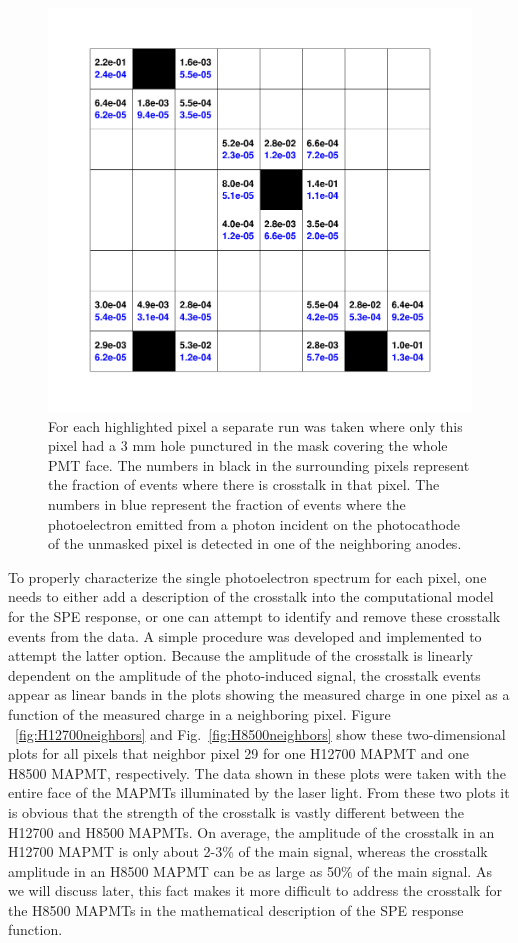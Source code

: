 \begin{figure}
	\centering
	\includegraphics[width=\linewidth]{figures/H12700_ct_ratio_updated.png}
	\caption{For each highlighted pixel a separate run was taken where only this pixel had a 3 mm hole punctured in the mask covering the whole PMT face. The numbers in black in the surrounding pixels represent the fraction of events where there is crosstalk in that pixel. The numbers in blue represent the fraction of events where the photoelectron emitted from a photon incident on the photocathode of the unmasked pixel is detected in one of the neighboring anodes.}
	\label{fig:H12700_ct_ratio}
\end{figure}

To properly characterize the single photoelectron spectrum for each pixel, one needs to either add a description of the crosstalk into the computational model for the SPE response, or one can attempt to identify and remove these crosstalk events from the data. A simple procedure was developed and implemented to attempt the latter option. Because the amplitude of the crosstalk is linearly dependent on the amplitude of the photo-induced signal, the crosstalk events appear as linear bands in the plots showing the measured charge in one pixel as a function of the measured charge in a neighboring pixel. Figure ~\ref{fig:H12700neighbors} and Fig.~\ref{fig:H8500neighbors} show these two-dimensional plots for all pixels that neighbor pixel 29 for one H12700 MAPMT and one H8500 MAPMT, respectively. The data shown in these plots were taken with the entire face of the MAPMTs illuminated by the laser light. From these two plots it is obvious that the strength of the crosstalk is vastly different between the H12700 and H8500 MAPMTs. On average, the amplitude of the crosstalk in an H12700 MAPMT is only about 2-3$\%$ of the main signal, whereas the crosstalk amplitude in an H8500 MAPMT can be as large as 50$\%$ of the main signal. As we will discuss later, this fact makes it more difficult to address the crosstalk for the H8500 MAPMTs in the mathematical description of the SPE response function.

